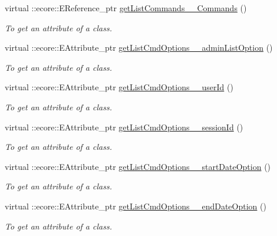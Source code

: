 \begin{DoxyCompactItemize}
virtual ::ecore::EReference\_\-ptr \hyperlink{classUMS__Data_1_1UMS__DataPackage_ad3e44f128a90e07d974afc09e8cbd9c7}{getListCommands\_\-\_\-Commands} ()
\begin{DoxyCompactList}\small\item\em To get an attribute of a class. \item\end{DoxyCompactList}\item 
virtual ::ecore::EAttribute\_\-ptr \hyperlink{classUMS__Data_1_1UMS__DataPackage_a50d75b5533ec53b4bcc325de9cda4dbe}{getListCmdOptions\_\-\_\-adminListOption} ()
\begin{DoxyCompactList}\small\item\em To get an attribute of a class. \item\end{DoxyCompactList}\item 
virtual ::ecore::EAttribute\_\-ptr \hyperlink{classUMS__Data_1_1UMS__DataPackage_a6111d52bd4c81d42c7b1e94604ff9030}{getListCmdOptions\_\-\_\-userId} ()
\begin{DoxyCompactList}\small\item\em To get an attribute of a class. \item\end{DoxyCompactList}\item 
virtual ::ecore::EAttribute\_\-ptr \hyperlink{classUMS__Data_1_1UMS__DataPackage_a8eb20b2e423462890bc63016585c1f6b}{getListCmdOptions\_\-\_\-sessionId} ()
\begin{DoxyCompactList}\small\item\em To get an attribute of a class. \item\end{DoxyCompactList}\item 
virtual ::ecore::EAttribute\_\-ptr \hyperlink{classUMS__Data_1_1UMS__DataPackage_af99d1d441b2fafb5a670dd2f986cce0f}{getListCmdOptions\_\-\_\-startDateOption} ()
\begin{DoxyCompactList}\small\item\em To get an attribute of a class. \item\end{DoxyCompactList}\item 
virtual ::ecore::EAttribute\_\-ptr \hyperlink{classUMS__Data_1_1UMS__DataPackage_afed557a06d2f0a5c3fe387187a031741}{getListCmdOptions\_\-\_\-endDateOption} ()
\begin{DoxyCompactList}\small\item\em To get an attribute of a class. \item\end{DoxyCompactList}\item 

\end{DoxyCompactItemize}
